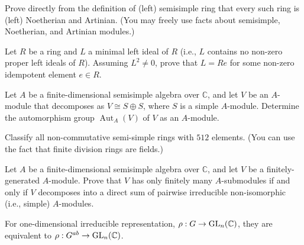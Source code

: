 \begin{prob}[S2017-Q5]
    Prove directly from the definition of (left) semisimple ring that every such
ring is (left) Noetherian and Artinian. (You may freely use facts about
semisimple, Noetherian, and Artinian modules.)
\end{prob}

\begin{prob}[S2005-Q4]
    Let \( R \) be a ring and \( L \) a minimal left ideal of \( R \) (i.e., \( L \) contains no non-zero proper left ideals of \( R \)). Assuming \( L^2 \neq 0 \), prove that \( L = Re \) for some non-zero idempotent element \( e \in R \).
\end{prob}

\begin{prob}[S2016-Q6, F2006-Q6, F2008-Q6]
    Let \( A \) be a finite-dimensional semisimple algebra over \( \mathbb{C} \), and let \( V \) be an \( A \)-module that decomposes as \( V \cong S \oplus S \), where \( S \) is a simple \( A \)-module. Determine the automorphism group \( \operatorname{Aut}_A(V) \) of \( V \) as an \( A \)-module.
\end{prob}



\begin{prob}[S2010-Q5]
    Classify all non-commutative semi-simple rings with $512$ elements.
(You can use the fact that finite division rings are fields.)
\end{prob}

\begin{prob}[F2011-Q5]
    Let \( A \) be a finite-dimensional semisimple algebra over \( \mathbb{C} \), and let \( V \) be a finitely-generated \( A \)-module. Prove that \( V \) has only finitely many \( A \)-submodules if and only if \( V \) decomposes into a direct sum of pairwise irreducible non-isomorphic (i.e., simple)  \( A \)-modules.
\end{prob}

\begin{warn}
    For one-dimensional irreducible representation, $\rho: G\to \text{GL}_n(\mathbb{C})$, they are equivalent to $\rho: G^{ab}\to\text{GL}_n(\mathbb{C})$.
\end{warn}




















